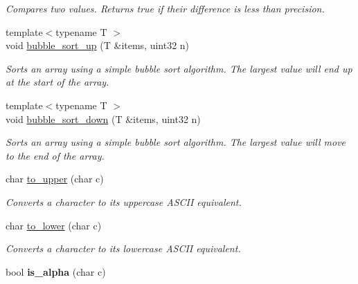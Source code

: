 \begin{DoxyCompactItemize}
\begin{DoxyCompactList}\small\item\em Compares two values. Returns true if their difference is less than precision. \end{DoxyCompactList}\item 
\hypertarget{namespaceetk_abce7b99a2170d49035d832c6d42cb67b}{{\footnotesize template$<$typename T $>$ }\\void \hyperlink{namespaceetk_abce7b99a2170d49035d832c6d42cb67b}{bubble\-\_\-sort\-\_\-up} (T \&items, uint32 n)}\label{namespaceetk_abce7b99a2170d49035d832c6d42cb67b}

\begin{DoxyCompactList}\small\item\em Sorts an array using a simple bubble sort algorithm. The largest value will end up at the start of the array. \end{DoxyCompactList}\item 
\hypertarget{namespaceetk_a7cc5047a4712f2e9a2fe5de4053b30c1}{{\footnotesize template$<$typename T $>$ }\\void \hyperlink{namespaceetk_a7cc5047a4712f2e9a2fe5de4053b30c1}{bubble\-\_\-sort\-\_\-down} (T \&items, uint32 n)}\label{namespaceetk_a7cc5047a4712f2e9a2fe5de4053b30c1}

\begin{DoxyCompactList}\small\item\em Sorts an array using a simple bubble sort algorithm. The largest value will move to the end of the array. \end{DoxyCompactList}\item 
\hypertarget{namespaceetk_a87cdf6530a78d045cf4ed4e680764c95}{char \hyperlink{namespaceetk_a87cdf6530a78d045cf4ed4e680764c95}{to\-\_\-upper} (char c)}\label{namespaceetk_a87cdf6530a78d045cf4ed4e680764c95}

\begin{DoxyCompactList}\small\item\em Converts a character to its uppercase A\-S\-C\-I\-I equivalent. \end{DoxyCompactList}\item 
\hypertarget{namespaceetk_a1f7495cf6a81da129ebfe05faaa35295}{char \hyperlink{namespaceetk_a1f7495cf6a81da129ebfe05faaa35295}{to\-\_\-lower} (char c)}\label{namespaceetk_a1f7495cf6a81da129ebfe05faaa35295}

\begin{DoxyCompactList}\small\item\em Converts a character to its lowercase A\-S\-C\-I\-I equivalent. \end{DoxyCompactList}\item 
\hypertarget{namespaceetk_a7f93a3f2917442bf148e5110d784dcc8}{bool {\bfseries is\-\_\-alpha} (char c)}\label{namespaceetk_a7f93a3f2917442bf148e5110d784dcc8}


\end{DoxyCompactItemize}
